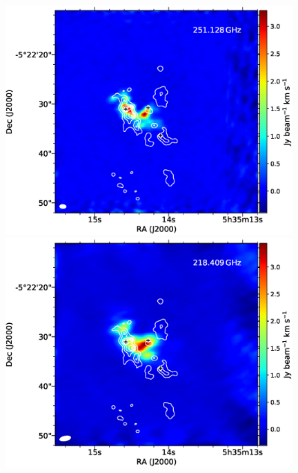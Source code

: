 \begin{figure}[H] 
\begin{center}
\begin{minipage}{0.98\textwidth} 
\begin{center}
\begin{minipage}{0.48\textwidth}
\begin{center}
\includegraphics[width=0.98\textwidth]{OrionKL/mom0/251.128mom0_3-7.eps}
\end{center}
\end{minipage}
\begin{minipage}{0.48\textwidth}
\begin{center}
\includegraphics[width=0.98\textwidth]{OrionKL/mom0/218.409mom0_3-7.eps}
\end{center}
\end{minipage}
\end{center}
\end{minipage}


\end{center}
\end{figure}
